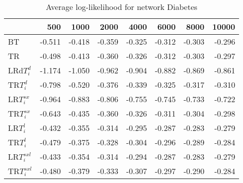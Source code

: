 \begin{table}
 \begin{center}
 \begin{tabular}{lrrrrrrr}
& 500 &  1000 & 2000 & 4000 & 6000& 8000&  10000\\\hline
BT & -0.511 & -0.418 & -0.359 & -0.325 & -0.312 & -0.303 & -0.296\\\hline
TR & -0.498 & -0.413 & -0.360 & -0.326 & -0.312 & -0.303 & -0.297\\\hline
LRd$T_i^d$ & -1.174 & -1.050 & -0.962 & -0.904 & -0.882 & -0.869 & -0.861\\\hline
TR$T_i^d$ & -0.798 & -0.520 & -0.376 & -0.339 & -0.325 & -0.317 & -0.310\\\hline
LR$T_i^{sx}$ & -0.964 & -0.883 & -0.806 & -0.755 & -0.745 & -0.733 & -0.722\\\hline
TR$T_i^{sx}$ & -0.643 & -0.435 & -0.360 & -0.326 & -0.311 & -0.304 & -0.298\\\hline
LR$T_i^l$ & -0.432 & -0.355 & -0.314 & -0.295 & -0.287 & -0.283 & -0.279\\\hline
TR$T_i^l$ & -0.479 & -0.375 & -0.328 & -0.304 & -0.296 & -0.289 & -0.284\\\hline
LR$T_i^{sxl}$ & -0.433 & -0.354 & -0.314 & -0.294 & -0.287 & -0.283 & -0.279\\\hline
TR$T_i^{sxl}$ & -0.480 & -0.379 & -0.333 & -0.307 & -0.297 & -0.290 & -0.284\\\hline
\end{tabular}
\end{center}
\caption{Average log-likelihood for network Diabetes }
\label{Diabetesll}
\end{table}


